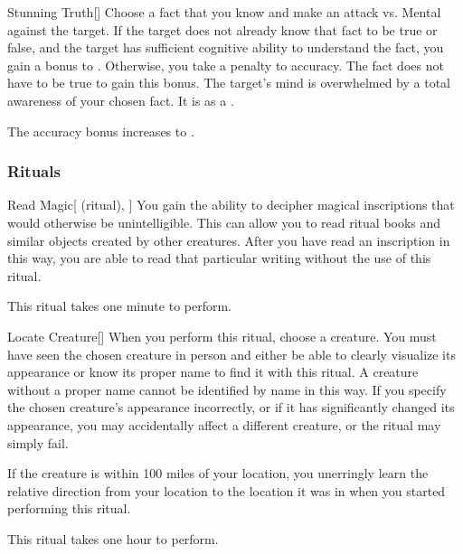 \lowercase{\hypertarget{spell:Stunning Truth}{}}\label{spell:Stunning Truth}
\begin{freeability}[Rank 5]{\hypertarget{spell:Stunning Truth}{Stunning Truth}}[]
Choose a fact that you know and make an attack vs. Mental against the target.
If the target does not already know that fact to be true or false,
and the target has sufficient cognitive ability to understand the fact,
you gain a  bonus to .
Otherwise, you take a  penalty to accuracy.
The fact does not have to be true to gain this bonus.
\hit The target's mind is overwhelmed by a total awareness of your chosen fact.
It is  as a .

\rankline
{} The accuracy bonus increases to .
\end{freeability}
\vspace{0.25em}



\subsubsection{Rituals}


\lowercase{\hypertarget{spell:Read Magic}{}}\label{spell:Read Magic}
\begin{attuneability}[Rank 1]{\hypertarget{spell:Read Magic}{Read Magic}}[ (ritual), ]
You gain the ability to decipher magical inscriptions that would otherwise be unintelligible.
This can allow you to read ritual books and similar objects created by other creatures.
After you have read an inscription in this way, you are able to read that particular writing without the use of this ritual.

This ritual takes one minute to perform.
\end{attuneability}
\vspace{0.25em}



\lowercase{\hypertarget{spell:Locate Creature}{}}\label{spell:Locate Creature}
\begin{freeability}[Rank 3]{\hypertarget{spell:Locate Creature}{Locate Creature}}[]
\targetrule
When you perform this ritual, choose a creature.
You must have seen the chosen creature in person and either be able to clearly visualize its appearance or know its proper name to find it with this ritual.
A creature without a proper name cannot be identified by name in this way.
If you specify the chosen creature's appearance incorrectly, or if it has significantly changed its appearance, you may accidentally affect a different creature, or the ritual may simply fail.

If the creature is within 100 miles of your location, you unerringly learn the relative direction from your location to the location it was in when you started performing this ritual.

This ritual takes one hour to perform.
\end{freeability}
\vspace{0.25em}



